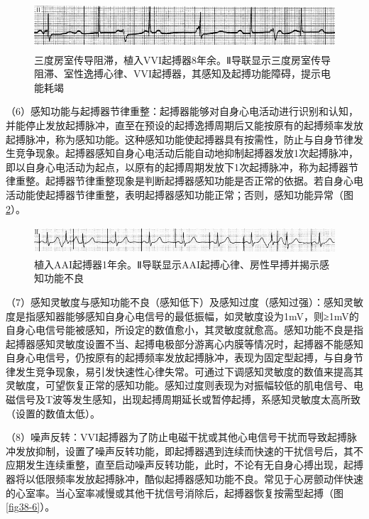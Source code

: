 \begin{figure}[!htbp]
 \centering
 \includegraphics[width=5.58333in,height=0.71875in]{./images/Image00607.jpg}
 \captionsetup{justification=centering}
 \caption{三度房室传导阻滞，植入VVI起搏器8年余。Ⅱ导联显示三度房室传导阻滞、室性逸搏心律、VVI起搏器，其感知及起搏功能障碍，提示电能耗竭}
 \label{fig38-4}
  \end{figure} 

（6）感知功能与起搏器节律重整：起搏器能够对自身心电活动进行识别和认知，并能停止发放起搏脉冲，直至在预设的起搏逸搏周期后又能按原有的起搏频率发放起搏脉冲，称为感知功能。这种感知功能使起搏器具有按需性，防止与自身节律发生竞争现象。起搏器感知自身心电活动后能自动地抑制起搏器发放1次起搏脉冲，即以自身心电活动为起点，以原有的起搏周期发放下1次起搏脉冲，称为起搏器节律重整。起搏器节律重整现象是判断起搏器感知功能是否正常的依据。若自身心电活动能使起搏器节律重整，表明起搏器感知功能正常；否则，感知功能异常（图\ref{fig38-5}）。

\begin{figure}[!htbp]
 \centering
 \includegraphics[width=5.58333in,height=0.41667in]{./images/Image00608.jpg}
 \captionsetup{justification=centering}
 \caption{植入AAI起搏器1年余。Ⅱ导联显示AAI起搏心律、房性早搏并揭示感知功能不良}
 \label{fig38-5}
  \end{figure} 

（7）感知灵敏度与感知功能不良（感知低下）及感知过度（感知过强）：感知灵敏度是指感知器能够感知自身心电信号的最低振幅，如灵敏度设为1mV，则≥1mV的自身心电信号能被感知，所设定的数值愈小，其灵敏度就愈高。感知功能不良是指起搏器感知灵敏度设置不当、起搏电极部分游离心内膜等情况时，起搏器不能感知自身心电信号，仍按原有的起搏频率发放起搏脉冲，表现为固定型起搏，与自身节律发生竞争现象，易引发快速性心律失常。可通过下调感知灵敏度的数值来提高其灵敏度，可望恢复正常的感知功能。感知过度则表现为对振幅较低的肌电信号、电磁信号及T波等发生感知，出现起搏周期延长或暂停起搏，系感知灵敏度太高所致（设置的数值太低）。

（8）噪声反转：VVI起搏器为了防止电磁干扰或其他心电信号干扰而导致起搏脉冲发放抑制，设置了噪声反转功能，即起搏器遇到连续而快速的干扰信号后，其不应期发生连续重整，直至启动噪声反转功能，此时，不论有无自身心搏出现，起搏器将以低限频率发放起搏脉冲，酷似起搏器感知功能不良。常见于心房颤动伴快速的心室率。当心室率减慢或其他干扰信号消除后，起搏器恢复按需型起搏（图\ref{fig38-6}）。

